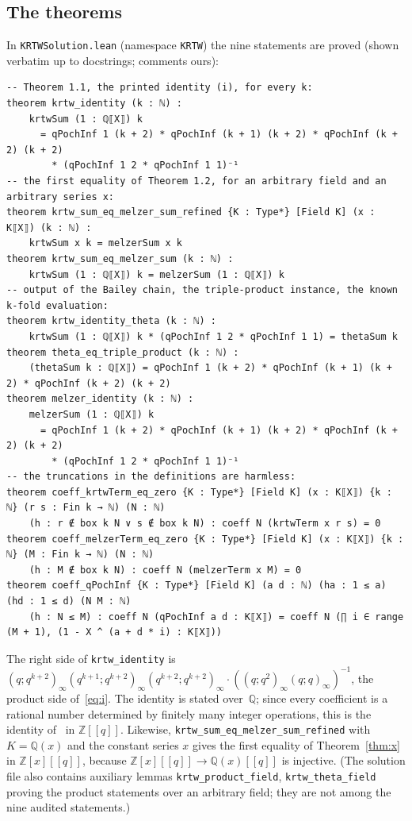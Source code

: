 \documentclass[11pt]{amsart}
\theoremstyle{definition}
\numberwithin{equation}{section}
\newcommand{\Z}{\mathbb{Z}}
\newcommand{\Q}{\mathbb{Q}}
\newcommand{\fpath}[1]{\nolinkurl{#1}}
\begin{document}
\subsection{The theorems}
In \fpath{KRTWSolution.lean} (namespace \texttt{KRTW}) the nine statements are proved (shown verbatim up to docstrings; comments ours):
\begin{lstlisting}
-- Theorem 1.1, the printed identity (i), for every k:
theorem krtw_identity (k : ℕ) :
    krtwSum (1 : ℚ⟦X⟧) k
      = qPochInf 1 (k + 2) * qPochInf (k + 1) (k + 2) * qPochInf (k + 2) (k + 2)
        * (qPochInf 1 2 * qPochInf 1 1)⁻¹
-- the first equality of Theorem 1.2, for an arbitrary field and an arbitrary series x:
theorem krtw_sum_eq_melzer_sum_refined {K : Type*} [Field K] (x : K⟦X⟧) (k : ℕ) :
    krtwSum x k = melzerSum x k
theorem krtw_sum_eq_melzer_sum (k : ℕ) :
    krtwSum (1 : ℚ⟦X⟧) k = melzerSum (1 : ℚ⟦X⟧) k
-- output of the Bailey chain, the triple-product instance, the known k-fold evaluation:
theorem krtw_identity_theta (k : ℕ) :
    krtwSum (1 : ℚ⟦X⟧) k * (qPochInf 1 2 * qPochInf 1 1) = thetaSum k
theorem theta_eq_triple_product (k : ℕ) :
    (thetaSum k : ℚ⟦X⟧) = qPochInf 1 (k + 2) * qPochInf (k + 1) (k + 2) * qPochInf (k + 2) (k + 2)
theorem melzer_identity (k : ℕ) :
    melzerSum (1 : ℚ⟦X⟧) k
      = qPochInf 1 (k + 2) * qPochInf (k + 1) (k + 2) * qPochInf (k + 2) (k + 2)
        * (qPochInf 1 2 * qPochInf 1 1)⁻¹
-- the truncations in the definitions are harmless:
theorem coeff_krtwTerm_eq_zero {K : Type*} [Field K] (x : K⟦X⟧) {k : ℕ} (r s : Fin k → ℕ) (N : ℕ)
    (h : r ∉ box k N ∨ s ∉ box k N) : coeff N (krtwTerm x r s) = 0
theorem coeff_melzerTerm_eq_zero {K : Type*} [Field K] (x : K⟦X⟧) {k : ℕ} (M : Fin k → ℕ) (N : ℕ)
    (h : M ∉ box k N) : coeff N (melzerTerm x M) = 0
theorem coeff_qPochInf {K : Type*} [Field K] (a d : ℕ) (ha : 1 ≤ a) (hd : 1 ≤ d) (N M : ℕ)
    (h : N ≤ M) : coeff N (qPochInf a d : K⟦X⟧) = coeff N (∏ i ∈ range (M + 1), (1 - X ^ (a + d * i) : K⟦X⟧))
\end{lstlisting}
The right side of \texttt{krtw\_identity} is
$(q;q^{k+2})_\infty(q^{k+1};q^{k+2})_\infty(q^{k+2};q^{k+2})_\infty\cdot((q;q^2)_\infty(q;q)_\infty)^{-1}$,
the product side of~\eqref{eq:i}. The identity is stated over~$\Q$; since every coefficient is a
rational number determined by finitely many integer operations, this is the identity of~\cite{KRTW} in
$\Z[[q]]$. Likewise, \texttt{krtw\_sum\_eq\_melzer\_sum\_refined} with $K=\Q(x)$ and the constant series $x$ gives
the first equality of Theorem~\ref{thm:x} in $\Z[x][[q]]$, because $\Z[x][[q]]\to\Q(x)[[q]]$ is injective.
(The solution file also contains auxiliary lemmas \texttt{krtw\_product\_field}, \texttt{krtw\_theta\_field}
proving the product statements over an arbitrary field; they are not among the nine audited statements.)
\end{document}
